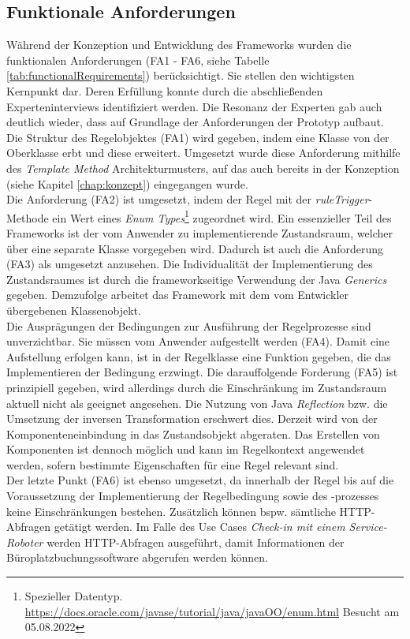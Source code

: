     \subsection*{Funktionale Anforderungen}
        Während der Konzeption und Entwicklung des Frameworks wurden die funktionalen Anforderungen (FA1 - FA6, siehe Tabelle \ref{tab:functionalRequirements}) 
        berücksichtigt. Sie stellen den wichtigsten Kernpunkt dar. Deren Erfüllung konnte durch die abschließenden 
        Experteninterviews identifiziert werden. Die Resonanz der Experten gab auch deutlich wieder, dass auf Grundlage der Anforderungen der Prototyp aufbaut. Die Struktur 
        des Regelobjektes (FA1) wird gegeben, indem eine Klasse von der Oberklasse erbt und diese erweitert. Umgesetzt wurde diese Anforderung mithilfe des 
        \textit{Template Method} Architekturmusters, auf das auch bereits in der Konzeption (siehe Kapitel \ref{chap:konzept}) eingegangen wurde. 
        \\
        \linebreak
        Die Anforderung (FA2) ist 
        umgesetzt, indem der Regel mit der \textit{ruleTrigger}-Methode ein Wert eines \textit{Enum Types}\footnote{Spezieller Datentyp. \url{https://docs.oracle.com/javase/tutorial/java/javaOO/enum.html} Besucht am 05.08.2022} 
        zugeordnet wird. Ein essenzieller Teil des Frameworks ist der vom Anwender zu implementierende Zustandsraum, welcher über eine separate Klasse vorgegeben wird. Dadurch 
        ist auch die Anforderung (FA3) als umgesetzt anzusehen. Die Individualität der Implementierung des Zustandsraumes ist durch die frameworkseitige Verwendung der 
        Java \textit{Generics} gegeben. Demzufolge arbeitet das Framework mit dem vom Entwickler übergebenen Klassenobjekt. 
        \\
        \linebreak
        Die Ausprägungen der Bedingungen zur Ausführung der Regelprozesse sind unverzichtbar. Sie müssen vom Anwender aufgestellt werden (FA4). Damit eine Aufstellung erfolgen kann, ist in der Regelklasse eine 
        Funktion gegeben, die das Implementieren der Bedingung erzwingt. 
        Die darauffolgende Forderung (FA5) ist prinzipiell gegeben, wird allerdings durch die Einschränkung im 
        Zustandsraum aktuell nicht als geeignet angesehen. Die Nutzung von Java \textit{Reflection} bzw. die Umsetzung der inversen Transformation erschwert dies. Derzeit wird von der Komponenteneinbindung 
        in das Zustandsobjekt abgeraten. Das Erstellen von Komponenten ist dennoch möglich und kann im Regelkontext angewendet werden, sofern bestimmte Eigenschaften für eine Regel relevant sind. 
        \\
        \linebreak
        Der letzte Punkt (FA6) ist ebenso umgesetzt, da innerhalb der Regel bis auf die Voraussetzung der Implementierung der Regelbedingung sowie des -prozesses keine Einschränkungen bestehen. 
        Zusätzlich können bspw. sämtliche \acs{HTTP}-Abfragen getätigt werden. Im Falle des Use Cases \textit{Check-in mit einem Service-Roboter} werden \acs{HTTP}-Abfragen ausgeführt, damit 
        Informationen der Büroplatzbuchungssoftware abgerufen werden können. 

